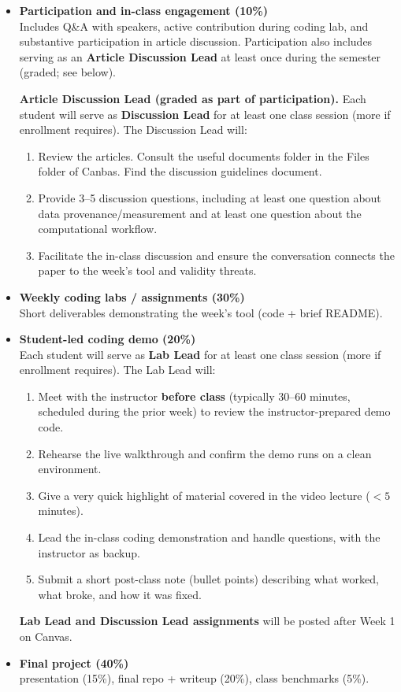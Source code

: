 \documentclass[letterpaper,11pt]{article}
\newcommand{\compresslist}{
\setlength{\itemsep}{1pt}
\setlength{\parskip}{0pt}
\setlength{\parsep}{0pt}
}
\begin{document}
\begin{itemize}
\compresslist
\item \textbf{Participation and in-class engagement (10\%)} \\
Includes Q\&A with speakers, active contribution during coding lab, and substantive participation in article discussion. Participation also includes serving as an \textbf{Article Discussion Lead} at least once during the semester (graded; see below).

\medskip
\noindent \textbf{Article Discussion Lead (graded as part of participation).} Each student will serve as \textbf{Discussion Lead} for at least one class session (more if enrollment requires). The Discussion Lead will:
\begin{enumerate}\compresslist
\item Review the articles. Consult the useful documents folder in the Files folder of Canbas. Find the discussion guidelines document. 
\item Provide 3--5 discussion questions, including at least one question about data provenance/measurement and at least one question about the computational workflow.
\item Facilitate the in-class discussion and ensure the conversation connects the paper to the week's tool and validity threats.
\end{enumerate}

\item \textbf{Weekly coding labs / assignments (30\%)} \\
Short deliverables demonstrating the week’s tool (code + brief README).

\item \textbf{Student-led coding demo (20\%)} \\
Each student will serve as \textbf{Lab Lead} for at least one class session (more if enrollment requires). The Lab Lead will:
\begin{enumerate}\compresslist
\item Meet with the instructor \textbf{before class} (typically 30--60 minutes, scheduled during the prior week) to review the instructor-prepared demo code.
\item Rehearse the live walkthrough and confirm the demo runs on a clean environment.
\item Give a very quick highlight of material covered in the video lecture ($<5$ minutes).
\item Lead the in-class coding demonstration and handle questions, with the instructor as backup.
\item Submit a short post-class note (bullet points) describing what worked, what broke, and how it was fixed.
\end{enumerate}
\noindent \textbf{Lab Lead and Discussion Lead assignments} will be posted after Week 1 on Canvas.

\item \textbf{Final project (40\%)} \\
presentation (15\%), final repo + writeup (20\%), class benchmarks (5\%).
\end{itemize}
\end{document}
